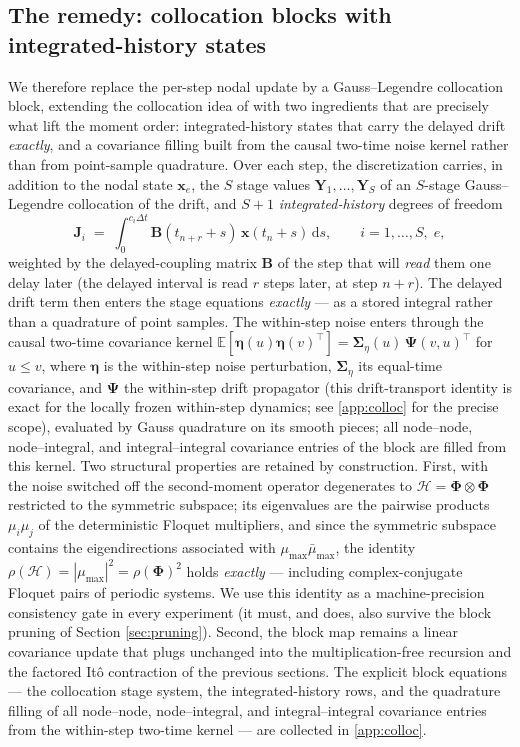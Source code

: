 \documentclass[preprint,12pt]{elsarticle}
\begin{document}
\subsection{The remedy: collocation blocks with integrated-history states}
We therefore replace the per-step nodal update by a Gauss--Legendre collocation block, extending the collocation idea of \cite{Fodor2023_PEM} with two ingredients that are precisely what lift the moment order: integrated-history states that carry the delayed drift \emph{exactly}, and a covariance filling built from the causal two-time noise kernel rather than from point-sample quadrature. Over each step, the discretization carries, in addition to the nodal state $\mathbf{x}_e$, the $S$ stage values $\mathbf{Y}_1,\dots,\mathbf{Y}_S$ of an $S$-stage Gauss--Legendre collocation of the drift, and $S{+}1$ \emph{integrated-history} degrees of freedom
\begin{equation}
\label{eq:Jdof}
\mathbf{J}_i \;=\; \int_{0}^{c_i \Delta t} \mathbf{B}(t_{n+r} + s)\, \mathbf{x}(t_n + s)\, \mathrm{d}s , \qquad i = 1, \dots, S, \; e,
\end{equation}
weighted by the delayed-coupling matrix $\mathbf{B}$ of the step that will \emph{read} them one delay later (the delayed interval is read $r$ steps later, at step $n+r$). The delayed drift term then enters the stage equations \emph{exactly} --- as a stored integral rather than a quadrature of point samples. The within-step noise enters through the causal two-time covariance kernel $\mathbb{E}[\boldsymbol\eta(u)\boldsymbol\eta(v)^\top] = \boldsymbol\Sigma_\eta(u)\,\boldsymbol\Psi(v,u)^\top$ for $u \le v$, where $\boldsymbol\eta$ is the within-step noise perturbation, $\boldsymbol\Sigma_\eta$ its equal-time covariance, and $\boldsymbol\Psi$ the within-step drift propagator (this drift-transport identity is exact for the locally frozen within-step dynamics; see \ref{app:colloc} for the precise scope), evaluated by Gauss quadrature on its smooth pieces; all node--node, node--integral, and integral--integral covariance entries of the block are filled from this kernel. Two structural properties are retained by construction. First, with the noise switched off the second-moment operator degenerates to $\mathcal{H} = \boldsymbol\Phi \otimes \boldsymbol\Phi$ restricted to the symmetric subspace; its eigenvalues are the pairwise products $\mu_i \mu_j$ of the deterministic Floquet multipliers, and since the symmetric subspace contains the eigendirections associated with $\mu_{\max}\bar\mu_{\max}$, the identity $\rho(\mathcal{H}) = |\mu_{\max}|^2 = \rho(\boldsymbol{\Phi})^2$ holds \emph{exactly} --- including complex-conjugate Floquet pairs of periodic systems. We use this identity as a machine-precision consistency gate in every experiment (it must, and does, also survive the block pruning of Section \ref{sec:pruning}). Second, the block map remains a linear covariance update that plugs unchanged into the multiplication-free recursion and the factored It\^o contraction of the previous sections. The explicit block equations --- the collocation stage system, the integrated-history rows, and the quadrature filling of all node--node, node--integral, and integral--integral covariance entries from the within-step two-time kernel --- are collected in \ref{app:colloc}.
\end{document}

